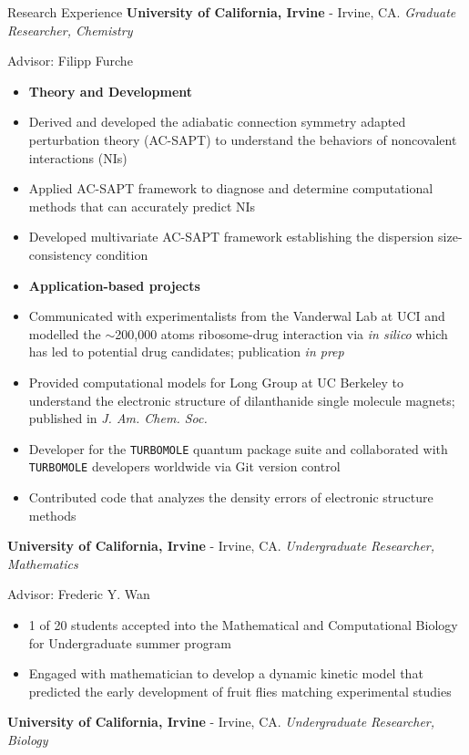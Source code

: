 \begin{rubric}{Research Experience}
  \textbf{University of California, Irvine} - Irvine, CA.
  \textit{Graduate Researcher, Chemistry}
  
  Advisor: Filipp Furche
  \vspace{-0.5em}
  \begin{itemize}
    \itemsep-0.5em
  \item[] \hspace{-0.33in}\textbf{Theory and Development}
  \item Derived and developed the adiabatic connection symmetry adapted perturbation theory
    (AC-SAPT) to understand the behaviors of noncovalent interactions (NIs)
  \item Applied AC-SAPT framework to diagnose and determine computational methods that can accurately
    predict NIs
  \item Developed multivariate AC-SAPT framework establishing the dispersion
    size-consistency condition
  \item[] \hspace{-0.33in}\textbf{Application-based projects}
  \item Communicated with experimentalists from the Vanderwal Lab at UCI and modelled
    the $\sim$200,000 atoms ribosome-drug interaction via \textit{in silico} which has led to
    potential drug candidates; publication \textit{in prep}
  \item Provided computational models for Long Group at UC Berkeley to understand the
    electronic structure of dilanthanide single molecule magnets; published in \textit{J. Am. Chem. Soc.}
  \item Developer for the \texttt{TURBOMOLE} quantum package suite and collaborated with \texttt{TURBOMOLE}
    developers worldwide via Git version control
  \item Contributed code that analyzes the density errors of electronic structure methods
  \end{itemize}
  \textbf{University of California, Irvine} - Irvine, CA.
  \textit{Undergraduate Researcher, Mathematics}

  Advisor: Frederic Y. Wan
  \vspace{-0.5em}
  \begin{itemize}
  \itemsep-0.5em
  \item 1 of 20 students accepted into the Mathematical and Computational Biology for Undergraduate
    summer program
  \item Engaged with mathematician to develop a dynamic kinetic model that predicted the early
    development of fruit flies matching experimental studies
  \end{itemize}
  \textbf{University of California, Irvine} - Irvine, CA.
  \textit{Undergraduate Researcher, Biology}


\end{rubric}
